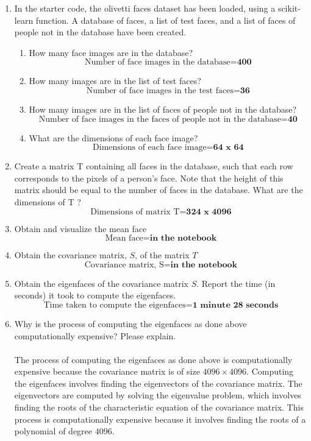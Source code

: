 \documentclass[12pt]{extarticle} %
\begin{document}
\begin{enumerate}
    \item In the starter code, the olivetti faces dataset has been loaded, using a scikit-learn function. A database
    of faces, a list of test faces, and a list of faces of people not in the database have been created.
    \begin{enumerate}
        \item How many face images are in the database? 
        \[
        \text{Number of face images in the database} = \textbf{400}
        \]
        \item How many images are in the list of test faces?
        \[
        \text{Number of face images in the test faces} = \textbf{36}
        \]
        \item How many images are in the list of faces of people not in the database?
        \[
        \text{Number of face images in the faces of people not in the database} = \textbf{40}
        \]
        \item What are the dimensions of each face image?
        \[
        \text{Dimensions of each face image} = \textbf{64 x 64}
        \]
    \end{enumerate}    
    \item Create a matrix T containing all faces in the database, such that each row corresponds to the pixels
    of a person’s face. Note that the height of this matrix should be equal to the number of faces in the
    database. What are the dimensions of T ?
    \[
    \text{Dimensions of matrix T} = \textbf{324 x 4096} 
    \]
    \item Obtain and visualize the mean face
    \[
    \text{Mean face} = \textbf{in the notebook}
    \]
    \item Obtain the covariance matrix, \(S\), of the matrix \(T\)
    \[
        \text{Covariance matrix, S} = \textbf{in the notebook}
    \]
    \item Obtain the eigenfaces of the covariance matrix \(S\). Report the time (in seconds) it took to compute the eigenfaces.
   \[
   \text{Time taken to compute the eigenfaces} = \textbf{1 minute 28 seconds}
   \]
    \item  Why is the process of computing the eigenfaces as done above computationally expensive? Please
    explain.
    \\\\ The process of computing the eigenfaces as done above is computationally expensive because the covariance matrix is of size \(4096 \times 4096\). Computing the eigenfaces involves finding the eigenvectors of the covariance matrix. The eigenvectors are computed by solving the eigenvalue problem, which involves finding the roots of the characteristic equation of the covariance matrix. This process is computationally expensive because it involves finding the roots of a polynomial of degree \(4096\).

\end{enumerate}
\end{document}
